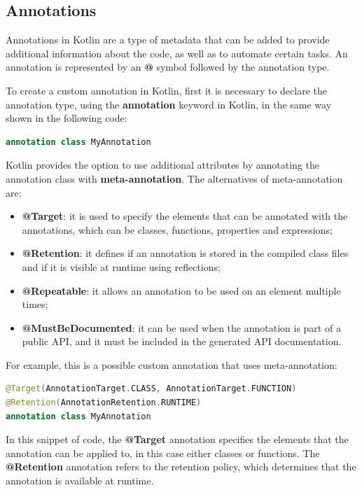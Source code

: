 \subsection{Annotations}
Annotations \cite{annotation_documentation} in Kotlin are a type of metadata that can be added to provide additional information about the code, as well as to automate certain tasks.\newline
An annotation is represented by an \textbf{@} symbol followed by the annotation type.

To create a custom annotation in Kotlin, first it is necessary to declare the annotation type, using the \textbf{annotation} keyword in Kotlin, in the same way shown in the following code:
\begin{lstlisting}[caption={Example of creation of a custom annotation in Kotlin}, language=Kotlin, captionpos=b, label={code:kotlin_annotations_creation}]
annotation class MyAnnotation
\end{lstlisting}

Kotlin provides the option to use additional attributes by annotating the annotation class with \textbf{meta-annotation}. The alternatives of meta-annotation are:
\begin{itemize}
    \item \textbf{@Target}: it is used to specify the elements that can be annotated with the annotations, which can be classes, functions, properties and expressions;
    \item \textbf{@Retention}: it defines if an annotation is stored in the compiled class files and if it is visible at runtime using reflections;
    \item \textbf{@Repeatable}: it allows an annotation to be used on an element multiple times;
    \item \textbf{@MustBeDocumented}: it can be used when the annotation is part of a public API, and it must be included in the generated API documentation.
\end{itemize}

For example, this is a possible custom annotation that uses meta-annotation:
\begin{lstlisting}[caption={Example of custom annotation in Kotlin}, language=Kotlin, captionpos=b, label={code:kotlin_annotations_customization}]
@Target(AnnotationTarget.CLASS, AnnotationTarget.FUNCTION)
@Retention(AnnotationRetention.RUNTIME)
annotation class MyAnnotation
\end{lstlisting}
In this snippet of code, the \textbf{@Target} annotation specifies the elements that the annotation can be applied to, in this case either classes or functions. The \textbf{@Retention} annotation refers to the retention policy, which determines that the annotation is available at runtime.

